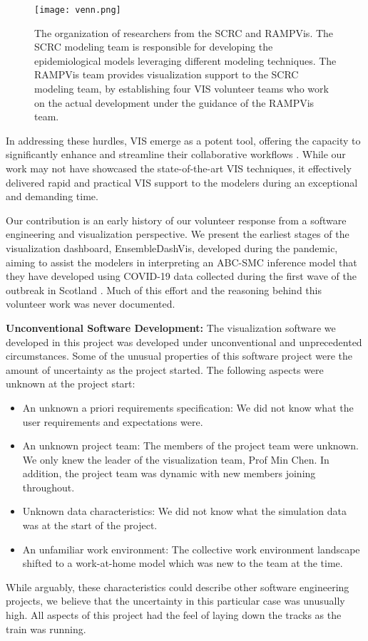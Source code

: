\begin{figure}[tb!]
    \centering
    \texttt{[image: venn.png]}
    \caption{The organization of researchers from the SCRC and RAMPVis. The SCRC modeling team is responsible for developing the epidemiological models leveraging different modeling techniques. The RAMPVis team provides visualization support to the SCRC modeling team, by establishing four VIS volunteer teams who work on the actual development under the guidance of the RAMPVis team.
    }
    \label{fig:venn}

\end{figure}

In addressing these hurdles, \ac{VIS} emerge as a potent tool, offering the capacity to significantly enhance and streamline their collaborative workflows \cite{swallow2022Challenges}.
While our work may not have showcased the state-of-the-art VIS techniques, it effectively delivered rapid and practical VIS support to the modelers during an exceptional and demanding time.

Our contribution is an early history of our volunteer response from a software engineering and visualization perspective.
We present the earliest stages of the visualization dashboard, EnsembleDashVis, developed during the pandemic, aiming to assist the modelers in interpreting an \ac{ABC-SMC} inference model that they have developed using COVID-19 data collected during the first wave of the outbreak in Scotland \cite{scrc2020Covid19}. 
Much of this effort and the reasoning behind this volunteer work was never documented.

\noindent
\textbf{Unconventional Software Development:}  
The visualization software we developed in this project was developed under unconventional and unprecedented circumstances.
Some of the unusual properties of this software project were the amount of uncertainty as the project started.
The following aspects were unknown at the project start:
\begin{itemize}[itemsep=0pt,topsep=0pt]
    \item An unknown a priori requirements specification: We did not know what the user requirements and expectations were.
    \item An unknown project team: The members of the project team were unknown.
    We only knew the leader of the visualization team, Prof Min Chen. 
    In addition, the project team was dynamic with new members joining throughout.
    \item Unknown data characteristics: We did not know what the simulation data was at the start of the project.
    \item An unfamiliar work environment: The collective work environment landscape shifted to a work-at-home model which was new to the team at the time.
\end{itemize}
While arguably, these characteristics could describe other software engineering projects, we believe that the uncertainty in this particular case was unusually high.
All aspects of this project had the feel of laying down the tracks as the train was running.